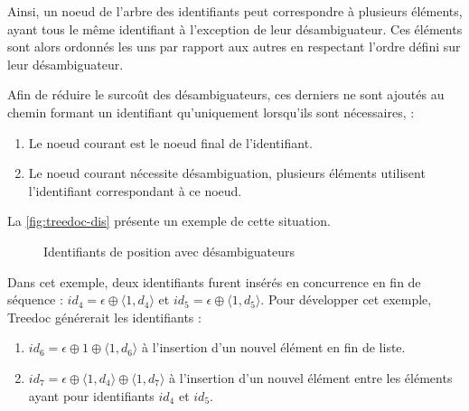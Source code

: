 Ainsi, un noeud de l'arbre des identifiants peut correspondre à plusieurs éléments, ayant tous le même identifiant à l'exception de leur désambiguateur.
Ces éléments sont alors ordonnés les uns par rapport aux autres en respectant l'ordre défini sur leur désambiguateur.

Afin de réduire le surcoût des désambiguateurs, ces derniers ne sont ajoutés au chemin formant un identifiant qu'uniquement lorsqu'ils sont nécessaires, \ie :
\begin{enumerate}[label=(\roman*)]
  \item Le noeud courant est le noeud final de l'identifiant.
  \item Le noeud courant nécessite désambiguation, \ie plusieurs éléments utilisent l'identifiant correspondant à ce noeud.
\end{enumerate}
La \autoref{fig:treedoc-dis} présente un exemple de cette situation.
\begin{figure}[!ht]

  \centering
  \caption{Identifiants de position avec désambiguateurs}
  \label{fig:treedoc-dis}
\end{figure}
Dans cet exemple, deux identifiants furent insérés en concurrence en fin de séquence : $id_4 = \epsilon \oplus \langle 1,d_4 \rangle$ et $id_5 = \epsilon \oplus \langle 1,d_5 \rangle$.
Pour développer cet exemple, Treedoc générerait les identifiants :
\begin{enumerate}[label=(\roman*)]
  \item $id_6 = \epsilon \oplus 1 \oplus \langle 1,d_6 \rangle$ à l'insertion d'un nouvel élément en fin de liste.
  \item $id_7 = \epsilon \oplus \langle 1,d_4 \rangle \oplus \langle 1,d_7 \rangle$ à l'insertion d'un nouvel élément entre les éléments ayant pour identifiants $id_4$ et $id_5$.
\end{enumerate}

